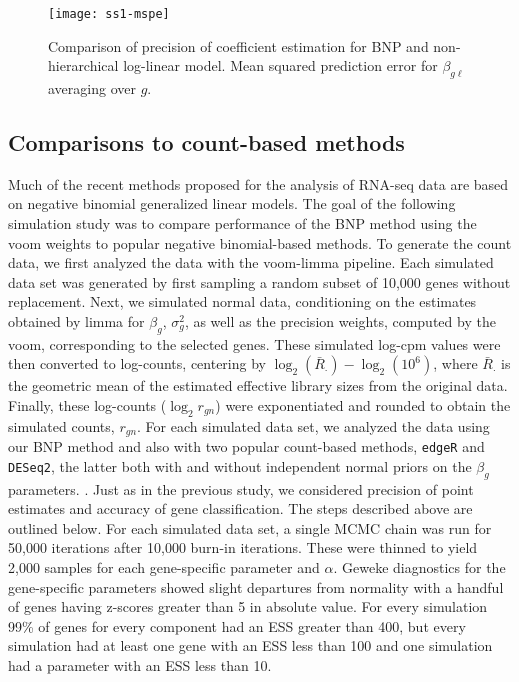 \begin{figure}[ht!]
\centering
\texttt{[image: ss1-mspe]}
\begin{minipage}{.8\textwidth}
\caption{\small Comparison of precision of coefficient estimation for BNP and non-hierarchical log-linear model. Mean squared prediction error for $\beta_{g\ell}$ averaging over $g$.}
\label{mspe-ss1}
\end{minipage}
\end{figure}

\subsection{Comparisons to count-based methods}
\label{sec:ss2}
Much of the recent methods proposed for the analysis of RNA-seq data are based on negative binomial generalized linear models. The goal of the following simulation study was to compare performance of the BNP method using the voom weights to popular negative binomial-based methods. To generate the count data, we first analyzed the \citet{paschold} data with the voom-limma pipeline. Each simulated data set was generated by first sampling a random subset of 10,000 genes without replacement. Next, we simulated normal data, conditioning on the estimates obtained by limma for $\beta_g$, $\sigma^2_g$, as well as the precision weights, computed by the voom, corresponding to the selected genes. These simulated log-cpm values were then converted to log-counts, centering by $\log_2(\bar{R}_\cdot)-\log_2(10^6)$, where $\bar{R}_\cdot$ is the geometric mean of the estimated effective library sizes from the original data. Finally, these log-counts ($\log_2 r_{gn}$) were exponentiated and rounded to obtain the simulated counts, $r_{gn}$. For each simulated data set, we analyzed the data using our BNP method and also with two popular count-based methods, \texttt{edgeR} and \texttt{DESeq2}, the latter both with and without independent normal priors on the $\beta_g$ parameters. \citep{edger2010,deseq2014}. Just as in the previous study, we considered precision of point estimates and accuracy of gene classification. The steps described above are outlined below. For each simulated data set, a single MCMC chain was run for 50,000 iterations after 10,000 burn-in iterations. These were thinned to yield 2,000 samples for each gene-specific parameter and $\alpha$. Geweke diagnostics for the gene-specific parameters showed slight departures from normality with a handful of genes having z-scores greater than 5 in absolute value. For every simulation 99\% of genes for every component had an ESS greater than 400, but every simulation had at least one gene with an ESS less than 100 and one simulation had a parameter with an ESS less than 10.

